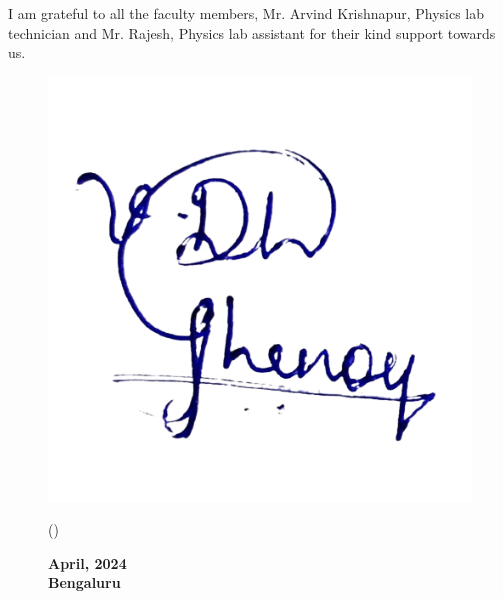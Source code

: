 \noindent
I am grateful to all the faculty members, Mr. Arvind Krishnapur, Physics lab technician and Mr. Rajesh, Physics lab assistant for their kind support towards us.

\vspace{0.25cm}

\noindent

\begin{figure}[h!]
    \flushleft
    \hspace{0.5cm}
    \includegraphics[scale=0.125]{images/sign.png}
    \begin{minipage}{0.5\textwidth}
        \flushleft
        (\auth)

    \end{minipage}%
    \begin{minipage}{0.5\textwidth}
        \flushright

        \textbf{April, 2024\\
          Bengaluru}
    \end{minipage}
\end{figure}

\restoregeometry

